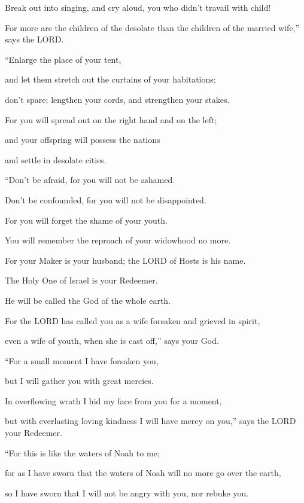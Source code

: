 \quad\quad Break out into singing, and cry aloud, you who didn’t travail with child!

For more are the children of the desolate than the children of the married wife,”
says the LORD.

\myverse{}“Enlarge the place of your tent,

and let them stretch out the curtains of your habitations;

don’t spare; lengthen your cords, and strengthen your stakes.

\myverse{}For you will spread out on the right hand and on the left;

and your offspring will possess the nations

and settle in desolate cities.


\vspace{\baselineskip} \myverse{}“Don’t be afraid, for you will not be ashamed.

Don’t be confounded, for you will not be disappointed.

For you will forget the shame of your youth.

You will remember the reproach of your widowhood no more.

\myverse{}For your Maker is your husband; the LORD of Hosts is his name.

The Holy One of Israel is your Redeemer.

He will be called the God of the whole earth.

\myverse{}For the LORD has called you as a wife forsaken and grieved in
spirit,

even a wife of youth, when she is cast off,” says your God.


\vspace{\baselineskip} \myverse{}“For a small moment I have forsaken you,

but I will gather you with great mercies.

\myverse{}In overflowing wrath I hid my face from you for a moment,

but with everlasting loving kindness I will have mercy on you,” says the LORD
your Redeemer.


\vspace{\baselineskip} \myverse{}“For this is like the waters of Noah to me;

for as I have sworn that the waters of Noah will no more go over the earth,

so I have sworn that I will not be angry with you, nor rebuke you.

